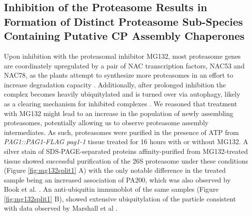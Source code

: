\subsection{Inhibition of the Proteasome Results in Formation of Distinct Proteasome Sub-Species Containing Putative CP Assembly Chaperones}
Upon inhibition with the proteasomal inhibitor MG132, most proteasome genes are coordinately upregulated by a pair of NAC transcription factors, NAC53 and NAC78, as the plants attempt to synthesize more proteasomes in an effort to increase degradation capacity \citep{gladman16}. Additionally, after prolonged inhibition the complex becomes heavily ubiquitylated and is turned over via autophagy, likely as a clearing mechanism for inhibited complexes \citep{marshall15}. We reasoned that treatment with MG132 might lead to an increase in the population of newly assembling proteasomes, potentially allowing us to observe proteasome assembly intermediates. As such, proteasomes were purified in the presence of ATP from \textit{PAG1::PAG1-FLAG pag1-1} tissue treated for 16 hours with or without MG132. A silver stain of SDS-PAGE-separated proteins affinity-purified from MG132-treated tissue showed successful purification of the 26S proteasome under these conditions (Figure \ref{fig:mg132split1} A) with the only notable difference in the treated sample being an increased association of PA200, which was also observed by Book et al. \citep{book10}. An anti-ubiquitin immunoblot of the same samples (Figure \ref{fig:mg132split1} B), showed extensive ubiquitylation of the particle consistent with data observed by Marshall et al \citep{marshall15}.

